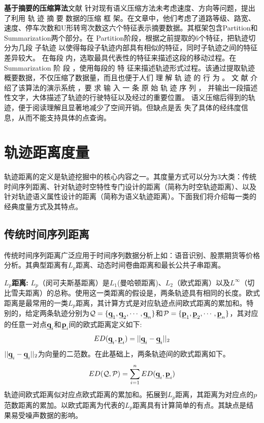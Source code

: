 \textbf{基于摘要的压缩算法}文献\cite{STMaker} 针对现有语义压缩方法未考虑速度、方向等问题，提出了利用 轨 迹 摘 要 数据的压缩 框 架。在文章中，他们考虑了道路等级、路宽、速度、停车次数和U形转弯次数这六个特征表示摘要数据。其框架包含Partition和Summarization两个部分。在 Partition阶段，根据之前提取的6个特征，把轨迹切分为几段 子轨迹 以使得每段子轨迹内部具有相似的特征，同时子轨迹之间的特征差异较大。
在每段 内，选取最具代表性的特征来描述这段的移动过程。在 Summarization 阶 段 ，使用每段的 特 征来描述轨迹形式过程。该通过提取轨迹概要数据，不仅压缩了数据量，而且也便于人们 理 解 轨 迹 的 行 为 。
文 献 \cite{Makesense}介绍了该算法的演示系统 ，要 求 输 入 一 条 原 始 轨 迹 序 列 ， 并输出一段描述性文字，大体描述了轨迹的行驶特征以及经过的重要位置。
语义压缩后得到的轨迹，便于阅读理解且显著地减少了空间开销。但缺点是丢 失了具体的经纬度信息，从而不能支持具体的点查询。



\section{轨迹距离度量}\label{sec-c2-measures}
轨迹距离的定义是轨迹挖掘中的核心内容之一。其度量方式可以分为3大类：传统时间序列距离、针对轨迹时空特性专门设计的距离（简称为时空轨迹距离）、以及针对轨迹语义属性设计的距离（简称为语义轨迹距离）。下面我们将介绍每一类的经典度量方式及其特点。

\subsection{传统时间序列距离}
传统时间序列距离广泛应用于时间序列数据分析上如：语音识别、股票期货等价格分析。其典型距离有$L_{p}$距离、动态时间卷曲距离和最长公共子串距离。

\textbf{$L_{p}$距离:}
$L_{p}$（闵可夫斯基距离）是$L_1$(曼哈顿距离)、$L_2$（欧式距离）以及$L^\infty$（切比雪夫距离）的总称。使用这一类距离的假设是，两条轨迹具有相同的长度。欧式距离是最常用的一类$L_{p}$距离，其计算方式是对应轨迹点间欧式距离的累加和。特别的，给定两条轨迹分别为${\cal{Q}}=\{\emph{{\textbf{q}}}_{1},\emph{{\textbf{q}}}_{2},\cdots,\emph{{\textbf{q}}}_{n}\}$和${\cal{P}}=\{\emph{{\textbf{p}}}_1,\emph{{\textbf{p}}}_{2},\cdots,\emph{{\textbf{p}}}_{n}\}$，其对应的任意一对点$\emph{{\textbf{q}}}_{i}$和$\emph{{\textbf{p}}}_{i}$间的欧式距离定义如下:
\begin{eqnarray}
ED(\emph{{\textbf{q}}}_{i},\emph{{\textbf{p}}}_{i})=||\emph{{\textbf{q}}}_{i} - \emph{{\textbf{q}}}_{i}||_{2}
\end{eqnarray}
$||\emph{{\textbf{q}}}_{i} - \emph{{\textbf{q}}}_{i}||_{2}$为向量的二范数。在此基础上，两条轨迹间的欧式距离如下。
\begin{eqnarray}
ED({\cal{Q}}, {\cal{P}})=\sum_{i=1}^{n}ED(\emph{{\textbf{q}}}_{i},\emph{{\textbf{p}}}_{i})
\end{eqnarray}
轨迹间欧式距离似对应点欧式距离的累加和。拓展到$L_{p}$距离，其距离为对应点的$p$范数距离的累加。以欧式距离为代表的$L_{p}$距离具有计算简单的有点。其缺点是结果易受噪声数据的影响。

